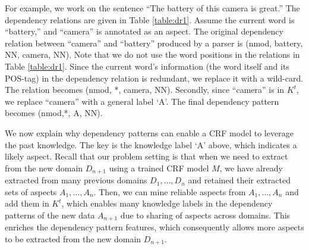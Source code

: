 \documentclass[11pt,a4paper]{article}
\theoremstyle{definition}
\begin{document}
\begin{enumerate}
    

\end{enumerate}

For example, we work on the sentence ``The battery of this camera is great.'' The dependency relations are given in Table \ref{table:dr1}. Assume the current word is ``battery,'' and ``camera'' is annotated as an aspect. The original dependency relation between ``camera'' and ``battery'' produced by a parser is (nmod, battery, NN, camera, NN). Note that we do not use the word positions in the relations in Table \ref{table:dr1}. Since the current word's information (the word itself and its POS-tag) in the dependency relation is redundant, we replace it with a wild-card. The relation becomes (nmod, *, camera, NN). Secondly, since ``camera'' is in $K^t$, we replace ``camera'' with a general label `A'. The final dependency pattern becomes (nmod,*, A, NN).


We now explain why dependency patterns can enable a CRF model to leverage the past knowledge. The key is the knowledge label `A' above, which indicates a likely aspect. Recall that our problem setting is that when we need to extract from the new domain $D_{n+1}$ using a trained CRF model $M$, we have already extracted from many previous domains $D_1, \dots, D_n$ and retained their extracted sets of aspects $A_1, \dots, A_n$. Then, we can mine reliable aspects from $A_1, \dots, A_n$ and add them in $K^t$, which enables many knowledge labels in the dependency patterns of the new data $A_{n+1}$ due to sharing of aspects across domains. This enriches the dependency pattern features, which consequently allows more aspects to be extracted from the new domain $D_{n+1}$.   
\end{document}
